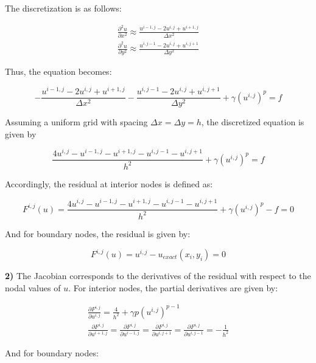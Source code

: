 \documentclass[12pt]{article}
\begin{document}
The discretization is as follows:

\begin{eqnarray}
\frac{\partial^2 u}{\partial x^2} \approx \frac{u^{i-1,j} - 2u^{i,j} + u^{i+1,j}}{\Delta x^2} \\
\frac{\partial^2 u}{\partial y^2} \approx \frac{u^{i,j-1} - 2u^{i,j} + u^{i,j+1}}{\Delta y^2} 
\end{eqnarray}

Thus, the equation becomes:

\begin{equation}
  - \frac{u^{i-1,j} - 2u^{i,j} + u^{i+1,j}}{\Delta x^2} - \frac{u^{i,j-1} - 2u^{i,j} + u^{i,j+1}}{\Delta y^2} + \gamma (u^{i,j})^p = f
\end{equation}

Assuming a uniform grid with spacing $\Delta x = \Delta y = h$, the discretized equation is given by

\begin{equation}
      \frac{ 4u^{i,j} -u^{i-1,j} - u^{i+1,j} - u^{i,j-1}- u^{i,j+1}}{h^2} + \gamma (u^{i,j})^p = f  
\end{equation}

Accordingly, the residual at interior nodes is defined as:

\begin{equation}
      F^{i,j}(u) =    \frac{ 4u^{i,j} -u^{i-1,j} - u^{i+1,j} - u^{i,j-1}- u^{i,j+1}}{h^2} + \gamma (u^{i,j})^p - f = 0  
\end{equation}

And for boundary nodes, the residual is given by:

\begin{equation}
    F^{i,j}(u) = u^{i,j} - u_{exact}(x_i,y_i) = 0
\end{equation}

\textbf{2)} The Jacobian corresponds to the derivatives of the residual with respect to the nodal values of $u$. For interior nodes, the partial derivatives are given by:

\begin{eqnarray}
    \frac{\partial F^{i,j}}{\partial u^{i,j}} = \frac{4}{h^2} + \gamma p (u^{i,j})^{p-1}\\
    \frac{\partial F^{i,j}}{\partial u^{i+1,j}} = \frac{\partial F^{i,j}}{\partial u^{i-1,j}} = \frac{\partial F^{i,j}}{\partial u^{i,j+1}} = \frac{\partial F^{i,j}}{\partial u^{i,j-1}} = -\frac{1}{h^2}
\end{eqnarray}


And for boundary nodes:
\end{document}

